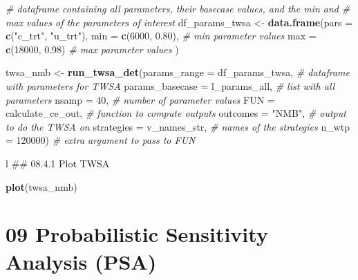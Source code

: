 \documentclass[]{article}
\newenvironment{Shaded}{\begin{snugshade}}{\end{snugshade}}
\newcommand{\KeywordTok}[1]{\textcolor[rgb]{0.13,0.29,0.53}{\textbf{#1}}}
\newcommand{\DataTypeTok}[1]{\textcolor[rgb]{0.13,0.29,0.53}{#1}}
\newcommand{\DecValTok}[1]{\textcolor[rgb]{0.00,0.00,0.81}{#1}}
\newcommand{\FloatTok}[1]{\textcolor[rgb]{0.00,0.00,0.81}{#1}}
\newcommand{\StringTok}[1]{\textcolor[rgb]{0.31,0.60,0.02}{#1}}
\newcommand{\CommentTok}[1]{\textcolor[rgb]{0.56,0.35,0.01}{\textit{#1}}}
\newcommand{\NormalTok}[1]{#1}
\begin{document}
\begin{Shaded}
\begin{Highlighting}[]
\CommentTok{# dataframe containing all parameters, their basecase values, and the min and }
\CommentTok{# max values of the parameters of interest}
\NormalTok{df_params_twsa <-}\StringTok{ }\KeywordTok{data.frame}\NormalTok{(}\DataTypeTok{pars =} \KeywordTok{c}\NormalTok{(}\StringTok{"c_trt"}\NormalTok{, }\StringTok{"u_trt"}\NormalTok{),}
                             \DataTypeTok{min  =} \KeywordTok{c}\NormalTok{(}\DecValTok{6000}\NormalTok{, }\FloatTok{0.80}\NormalTok{),  }\CommentTok{# min parameter values}
                             \DataTypeTok{max  =} \KeywordTok{c}\NormalTok{(}\DecValTok{18000}\NormalTok{, }\FloatTok{0.98}\NormalTok{)  }\CommentTok{# max parameter values}
\NormalTok{                             )}

\NormalTok{twsa_nmb <-}\StringTok{ }\KeywordTok{run_twsa_det}\NormalTok{(}\DataTypeTok{params_range    =}\NormalTok{ df_params_twsa,    }\CommentTok{# dataframe with parameters for TWSA}
                         \DataTypeTok{params_basecase =}\NormalTok{ l_params_all,      }\CommentTok{# list with all parameters}
                         \DataTypeTok{nsamp           =} \DecValTok{40}\NormalTok{,                }\CommentTok{# number of parameter values}
                         \DataTypeTok{FUN             =}\NormalTok{ calculate_ce_out,  }\CommentTok{# function to compute outputs}
                         \DataTypeTok{outcomes        =} \StringTok{"NMB"}\NormalTok{,          }\CommentTok{# output to do the TWSA on}
                         \DataTypeTok{strategies      =}\NormalTok{ v_names_str,       }\CommentTok{# names of the strategies}
                         \DataTypeTok{n_wtp           =} \DecValTok{120000}\NormalTok{)            }\CommentTok{# extra argument to pass to FUN}
\end{Highlighting}
\end{Shaded}

l \#\# 08.4.1 Plot TWSA

\begin{Shaded}
\begin{Highlighting}[]
\KeywordTok{plot}\NormalTok{(twsa_nmb)}
\end{Highlighting}
\end{Shaded}

\section{09 Probabilistic Sensitivity Analysis
(PSA)}\label{probabilistic-sensitivity-analysis-psa}
\end{document}
